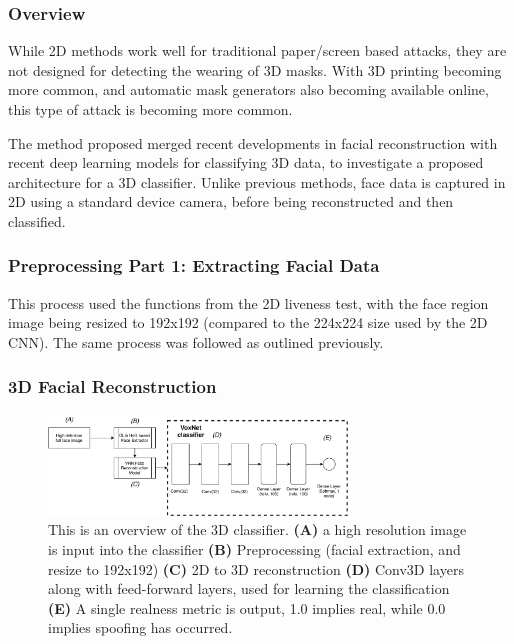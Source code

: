 \documentclass[12pt,a4paper]{article}
\begin{document}
        \subsubsection{Overview}
        While 2D methods work well for traditional paper/screen based attacks, they are not designed for detecting the wearing of 3D masks. With 3D printing
        becoming more common, and automatic mask generators also becoming available online, this type of attack is becoming more common.

        The method proposed merged recent developments in facial reconstruction with recent deep learning models for classifying 3D data, to investigate a proposed architecture for a 3D classifier. Unlike previous methods, face data is captured in 2D using a standard device camera, before being reconstructed and then classified.

        \subsubsection{Preprocessing Part 1: Extracting Facial Data}
            This process used the functions from the 2D liveness test, with the face region image being resized to 192x192 (compared to the 224x224 size used by the 2D CNN).
            The same process was followed as outlined previously.

        \subsubsection{3D Facial Reconstruction}
        \begin{figure}
            \centering
            \includegraphics[width=300px]{voxnet.pdf}
            \caption{
                This is an overview of the 3D classifier. \textbf{(A)} a high resolution image is input into the classifier \textbf{(B)} Preprocessing (facial extraction, and resize to 192x192)
                \textbf{(C)} 2D to 3D reconstruction
                \textbf{(D)} Conv3D layers along with feed-forward layers, used for learning the classification
                \textbf{(E)} A single realness metric is output, 1.0 implies real, while 0.0 implies spoofing has occurred.
            }
            \label{3DClassifierArchitectureDiagram}
        \end{figure}
\end{document}
